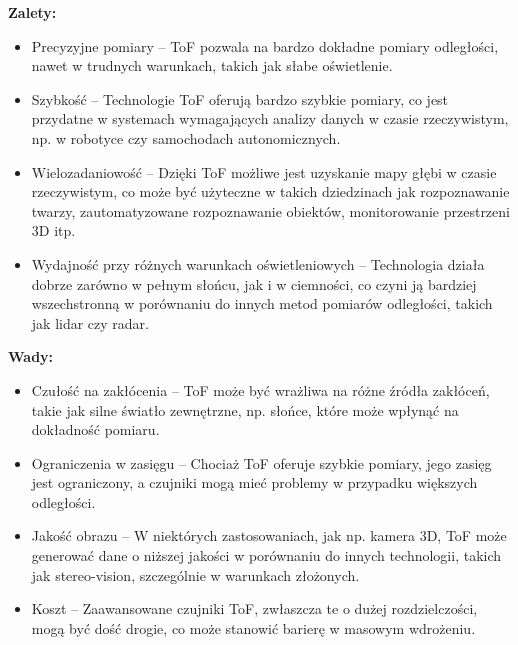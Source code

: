 \documentclass[magisterska]{pracadypl}
\begin{document}
\begin{minipage}[t]{0.45\textwidth}
\textbf{Zalety:}
\begin{itemize}
  \item Precyzyjne pomiary – ToF pozwala na bardzo dokładne pomiary odległości, nawet w trudnych warunkach, takich jak słabe oświetlenie.

  \item Szybkość – Technologie ToF oferują bardzo szybkie pomiary, co jest przydatne w systemach wymagających analizy danych w czasie rzeczywistym, np. w robotyce czy samochodach autonomicznych.

  \item Wielozadaniowość – Dzięki ToF możliwe jest uzyskanie mapy głębi w czasie rzeczywistym, co może być użyteczne w takich dziedzinach jak rozpoznawanie twarzy, zautomatyzowane rozpoznawanie obiektów, monitorowanie przestrzeni 3D itp.

  \item Wydajność przy różnych warunkach oświetleniowych – Technologia działa dobrze zarówno w pełnym słońcu, jak i w ciemności, co czyni ją bardziej wszechstronną w porównaniu do innych metod pomiarów odległości, takich jak lidar czy radar.
\end{itemize}
\end{minipage}
\hfill
\begin{minipage}[t]{0.45\textwidth}
\textbf{Wady:}
\begin{itemize}
  \item Czułość na zakłócenia – ToF może być wrażliwa na różne źródła zakłóceń, takie jak silne światło zewnętrzne, np. słońce, które może wpłynąć na dokładność pomiaru.

  \item Ograniczenia w zasięgu – Chociaż ToF oferuje szybkie pomiary, jego zasięg jest ograniczony, a czujniki mogą mieć problemy w przypadku większych odległości.

  \item Jakość obrazu – W niektórych zastosowaniach, jak np. kamera 3D, ToF może generować dane o niższej jakości w porównaniu do innych technologii, takich jak stereo-vision, szczególnie w warunkach złożonych.

  \item Koszt – Zaawansowane czujniki ToF, zwłaszcza te o dużej rozdzielczości, mogą być dość drogie, co może stanowić barierę w masowym wdrożeniu.
\end{itemize}
\end{minipage}
\end{document}

